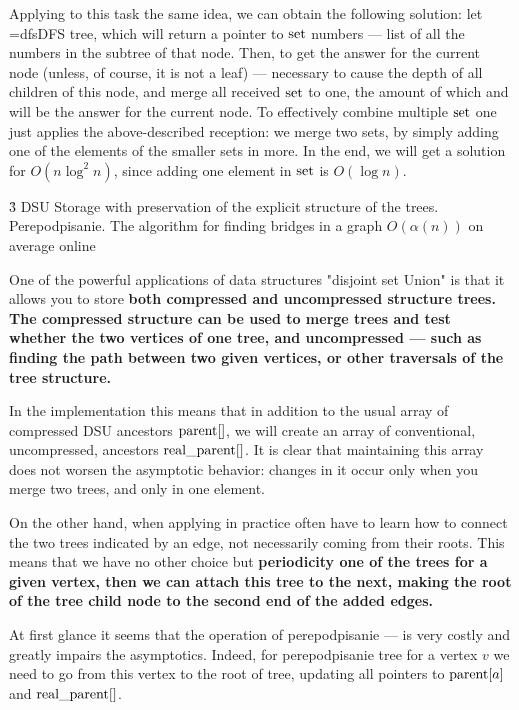 Applying to this task the same idea, we can obtain the following solution: let \algohref=dfs{DFS} tree, which will return a pointer to ${\rm set}$ numbers --- list of all the numbers in the subtree of that node. Then, to get the answer for the current node (unless, of course, it is not a leaf) --- necessary to cause the depth of all children of this node, and merge all received ${\rm set}$ to one, the amount of which and will be the answer for the current node. To effectively combine multiple ${\rm set}$ one just applies the above-described reception: we merge two sets, by simply adding one of the elements of the smaller sets in more. In the end, we will get a solution for $O (n \log^2 n)$, since adding one element in ${\rm set}$ is $O (\log n)$.



\h3{ DSU Storage with preservation of the explicit structure of the trees. Perepodpisanie. The algorithm for finding bridges in a graph $O(\alpha(n))$ on average online }

One of the powerful applications of data structures "disjoint set Union" is that it allows you to store \bf{both compressed and uncompressed structure trees}. The compressed structure can be used to merge trees and test whether the two vertices of one tree, and uncompressed --- such as finding the path between two given vertices, or other traversals of the tree structure.

In the implementation this means that in addition to the usual array of compressed DSU ancestors ${\rm parent} []$, we will create an array of conventional, uncompressed, ancestors ${\rm real\_parent}[]$. It is clear that maintaining this array does not worsen the asymptotic behavior: changes in it occur only when you merge two trees, and only in one element.

On the other hand, when applying in practice often have to learn how to connect the two trees indicated by an edge, not necessarily coming from their roots. This means that we have no other choice but \bf{periodicity} one of the trees for a given vertex, then we can attach this tree to the next, making the root of the tree child node to the second end of the added edges.

At first glance it seems that the operation of perepodpisanie --- is very costly and greatly impairs the asymptotics. Indeed, for perepodpisanie tree for a vertex $v$ we need to go from this vertex to the root of tree, updating all pointers to ${\rm parent} [a]$ and ${\rm real\_parent}[]$.

